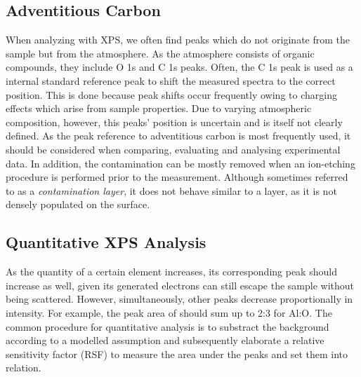 \subsection{Adventitious Carbon}
    
When analyzing with XPS, we often find peaks which do not originate from the sample but from the atmosphere. As the atmosphere consists of organic compounds, they include O 1s and C 1s peaks. Often, the C 1s peak is used as a internal standard reference peak to shift the measured spectra to the correct position. This is done because peak shifts occur frequently owing to charging effects which arise from sample properties. Due to varying atmospheric composition, however, this peaks' position is uncertain and is itself  not clearly defined. \cite{biesinger_accessing_2022} As the peak reference to adventitious carbon is most frequently used, it should be considered when comparing, evaluating and analysing experimental data.
In addition, the contamination can be mostly removed when an ion-etching procedure is performed prior to the measurement. Although sometimes referred to as a \emph{contamination layer}, it does not behave similar to a layer, as it is not densely populated on the surface.

\subsection{Quantitative XPS Analysis}
As the quantity of a certain element increases, its corresponding peak should increase as well, given its generated electrons can still escape the sample without being scattered. However, simultaneously, other peaks decrease proportionally in intensity. For example, the peak area of  should sum up to 2:3 for Al:O.
The common procedure for quantitative analysis is to substract the background according to a modelled assumption and subsequently elaborate a relative sensitivity factor (RSF) to measure the area under the peaks and set them into relation.

